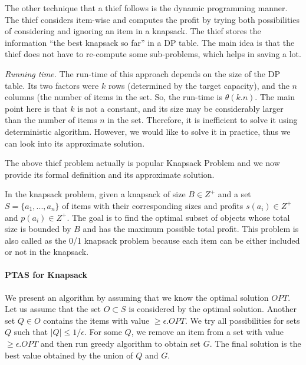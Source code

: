The other technique that a thief follows is the dynamic programming manner. 
The thief considers item-wise and computes the profit by trying both possibilities of considering and ignoring an item in a knapsack.
The thief stores the information ``the best knapsack so far'' in a DP table.
The main idea is that the thief does not have to re-compute some sub-problems, which helps in saving a lot.


\textit{Running time.} The run-time of this approach depends on the size of the DP table. 
Its two factors were $k$ rows (determined by the target capacity), and the $n$ columns (the number of items in the set. So, the run-time is $\theta(k.n)$. 
The main point here is that $k$ is not a constant, and its size may be considerably larger than the number of items $n$ in the set. Therefore, it is inefficient to solve it using deterministic algorithm.
However, we would like to solve it in practice, thus we can look into its approximate solution.

The above thief problem actually is popular Knapsack Problem and we now provide its formal definition and its approximate solution.

In the knapsack problem, given a knapsack of size $B \in Z^+$ and a set $S = \{a_1, . . . , a_n\}$
of items with their corresponding sizes and profits $s(a_i) \in Z^+$ and $p(a_i) \in Z^+$. The goal is to find
the optimal subset of objects whose total size is bounded by $B$ and has the maximum possible
total profit. This problem is also called as the 0/1 knapsack problem because each
item can be either included or not in the knapsack. 

\paragraph{PTAS for Knapsack}
We present an algorithm \citep{lawler1979fast} by assuming that we know the optimal solution $OPT$.
Let us assume that the set $O \subset S$ is considered by the optimal solution.
Another set $Q \in O$ contains the items with value $\ge \epsilon. OPT$.
We try all possibilities for sets $Q$ such that $|Q| \le 1/\epsilon$.
For some $Q$, we remove an item from a set with value $\ge \epsilon.OPT$ and then run greedy algorithm to obtain set $G$.
The final solution is the best value obtained by the union of $Q$ and $G$.

